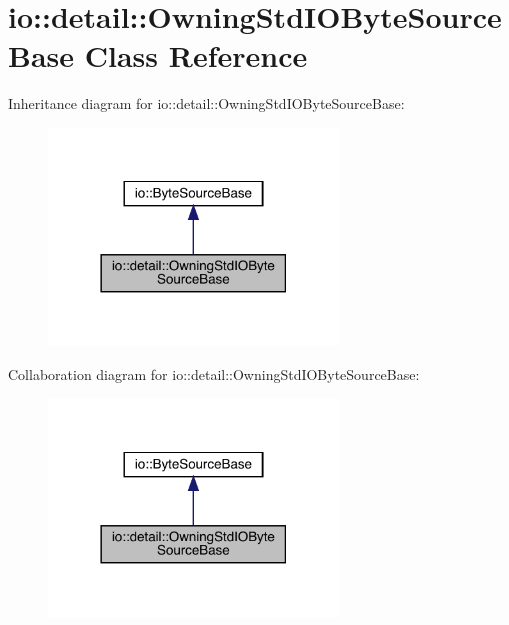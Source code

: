 \hypertarget{classio_1_1detail_1_1_owning_std_i_o_byte_source_base}{}\section{io\+:\+:detail\+:\+:Owning\+Std\+I\+O\+Byte\+Source\+Base Class Reference}
\label{classio_1_1detail_1_1_owning_std_i_o_byte_source_base}


Inheritance diagram for io\+:\+:detail\+:\+:Owning\+Std\+I\+O\+Byte\+Source\+Base\+:
\nopagebreak
\begin{figure}[H]
\begin{center}
\leavevmode
\includegraphics[width=218pt]{classio_1_1detail_1_1_owning_std_i_o_byte_source_base__inherit__graph}
\end{center}
\end{figure}


Collaboration diagram for io\+:\+:detail\+:\+:Owning\+Std\+I\+O\+Byte\+Source\+Base\+:
\nopagebreak
\begin{figure}[H]
\begin{center}
\leavevmode
\includegraphics[width=218pt]{classio_1_1detail_1_1_owning_std_i_o_byte_source_base__coll__graph}
\end{center}
\end{figure}
